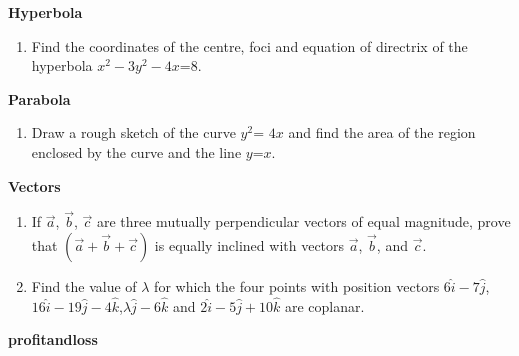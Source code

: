 \documentclass[12pt,-letter paper]{article}
\providecommand{\brak}[1]{\ensuremath{\left(#1\right)}}
\begin{document}
	\begin{center}
		\textbf{Hyperbola}
	\end{center}
	\begin{enumerate}
		\item Find the coordinates of the centre, foci and equation of directrix of the hyperbola $x^2-3y^2-4x$=$8$.
	\end{enumerate}
	\begin{center}
		\textbf{Parabola}
	\end{center}
	\begin{enumerate}
		\item Draw a rough sketch of the curve $y^2$= $4x$ and find the area of the region enclosed by the curve and the line $y$=$x$.
	\end{enumerate}
\begin{center}
	\textbf{Vectors}
\end{center}
\begin{enumerate}
  \item If $\overrightarrow{a}$, $\overrightarrow{b}$, $\overrightarrow{c}$ are three mutually perpendicular vectors of equal magnitude, prove that $\brak{\overrightarrow{a} + \overrightarrow{b} + \overrightarrow{c}}$ is equally inclined with vectors $\overrightarrow{a}$, $\overrightarrow{b}$, and $\overrightarrow{c}$.
  \item Find the value of $\lambda$ for which the four points with position vectors $6\hat{i}-7\hat{j}$,$16\hat{i}-19\hat{j}-4\hat{k}$,$\lambda\hat{j}-6\hat{k}$ and $2\hat{i}-5\hat{j}+10\hat{k}$ are coplanar.
\end{enumerate}
\begin{center}
	\textbf{profitandloss}
\end{center}
\end{document}
